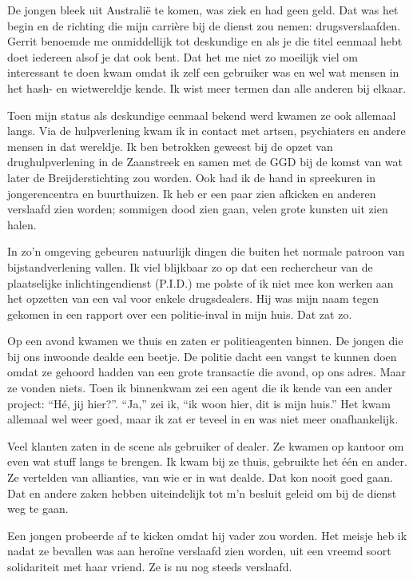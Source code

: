 \documentclass[12pt,twoside, openright]{memoir}
\begin{document}
De jongen bleek uit Australië te komen, was ziek en had geen geld. Dat was het begin en de richting die mijn carrière bij de dienst zou nemen: drugsverslaafden. Gerrit benoemde me onmiddellijk tot deskundige en als je die titel eenmaal hebt doet iedereen alsof je dat ook bent. Dat het me niet zo moeilijk viel om interessant te doen kwam omdat ik zelf een gebruiker was en wel wat mensen in het hash- en wietwereldje kende. Ik wist meer termen dan alle anderen bij elkaar. 

Toen mijn status als deskundige eenmaal bekend werd kwamen ze ook allemaal langs. Via de hulpverlening kwam ik in contact met artsen, psychiaters en andere mensen in dat wereldje. Ik ben betrokken geweest bij de opzet van drughulpverlening in de Zaanstreek en samen met de GGD bij de komst van wat later de Breijderstichting zou worden. Ook had ik de hand in spreekuren in jongerencentra en buurthuizen. Ik heb er een paar zien afkicken en anderen verslaafd zien worden; sommigen dood zien gaan, velen grote kunsten uit zien halen. 

In zo’n omgeving gebeuren natuurlijk dingen die buiten het normale patroon van bijstandverlening vallen. Ik viel blijkbaar zo op dat een rechercheur van de plaatselijke  inlichtingendienst (P.I.D.) me polste of ik niet mee kon werken aan het opzetten van een val voor enkele drugsdealers. Hij was mijn naam tegen gekomen in een rapport over een politie-inval in mijn huis. Dat zat zo. 

Op een avond kwamen we thuis en zaten er politieagenten binnen. De jongen die bij ons inwoonde dealde een beetje. De politie dacht een vangst te kunnen doen omdat ze gehoord hadden van een grote transactie die avond, op ons adres. Maar ze vonden niets. Toen ik binnenkwam zei een agent die ik kende van een ander project: ``Hé, jij hier?''. ``Ja,'' zei ik, ``ik woon hier, dit is mijn huis.'' Het kwam allemaal wel weer goed, maar ik zat er teveel in en was niet meer onafhankelijk. 

Veel klanten zaten in de scene als gebruiker of dealer. Ze kwamen op kantoor om even wat stuff langs te brengen. Ik kwam bij ze thuis, gebruikte het één en ander. Ze vertelden van allianties, van wie er in wat dealde. Dat kon nooit goed gaan. Dat en andere zaken hebben uiteindelijk tot m’n besluit geleid om bij de dienst weg te gaan. 

Een jongen probeerde af te kicken omdat hij vader zou worden. Het meisje heb ik nadat ze bevallen was aan heroïne verslaafd zien worden, uit een vreemd soort solidariteit met haar vriend. Ze is nu nog steeds verslaafd. 
\end{document}
